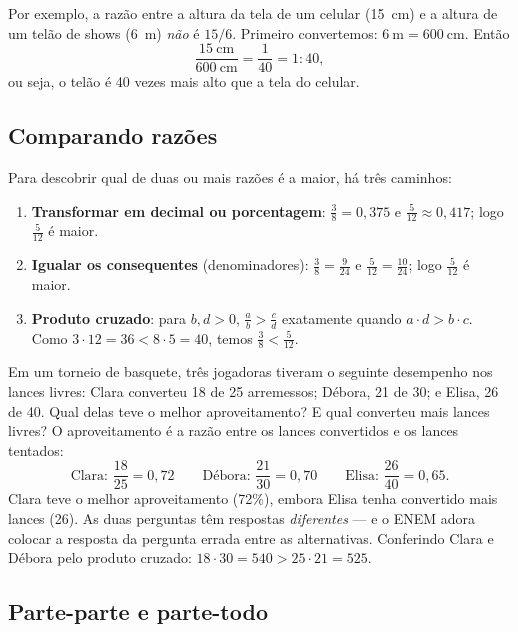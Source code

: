 Por exemplo, a razão entre a altura da tela de um celular (15~cm) e a altura de
um telão de shows (6~m) \emph{não} é $15/6$. Primeiro convertemos: $6~\text{m} = 600~\text{cm}$. Então
\[
  \frac{15~\text{cm}}{600~\text{cm}} = \frac{1}{40} = 1 : 40,
\]
ou seja, o telão é 40 vezes mais alto que a tela do celular.

\subsection{Comparando razões}

Para descobrir qual de duas ou mais razões é a maior, há três caminhos:
\begin{enumerate}[leftmargin=1.6em,itemsep=2pt]
  \item \textbf{Transformar em decimal ou porcentagem}: $\frac{3}{8} = 0{,}375$ e
        $\frac{5}{12} \approx 0{,}417$; logo $\frac{5}{12}$ é maior.
  \item \textbf{Igualar os consequentes} (denominadores): $\frac{3}{8} = \frac{9}{24}$
        e $\frac{5}{12} = \frac{10}{24}$; logo $\frac{5}{12}$ é maior.
  \item \textbf{Produto cruzado}: para $b, d > 0$, $\frac{a}{b} > \frac{c}{d}$ exatamente
        quando $a \cdot d > b \cdot c$. Como $3 \cdot 12 = 36 < 8 \cdot 5 = 40$, temos
        $\frac{3}{8} < \frac{5}{12}$.
\end{enumerate}

\begin{exemplo}
Em um torneio de basquete, três jogadoras tiveram o seguinte desempenho nos
lances livres: Clara converteu 18 de 25 arremessos; Débora, 21 de 30; e Elisa,
26 de 40. Qual delas teve o melhor aproveitamento? E qual converteu mais
lances livres?
\solucao
O aproveitamento é a razão entre os lances convertidos e os lances tentados:
\[
  \text{Clara: } \frac{18}{25} = 0{,}72 \qquad
  \text{Débora: } \frac{21}{30} = 0{,}70 \qquad
  \text{Elisa: } \frac{26}{40} = 0{,}65.
\]
Clara teve o melhor aproveitamento (72\%), embora Elisa tenha convertido mais
lances (26). As duas perguntas têm respostas \emph{diferentes} — e o ENEM adora
colocar a resposta da pergunta errada entre as alternativas. Conferindo Clara
e Débora pelo produto cruzado: $18 \cdot 30 = 540 > 25 \cdot 21 = 525$.
\end{exemplo}

\subsection{Parte-parte e parte-todo}


